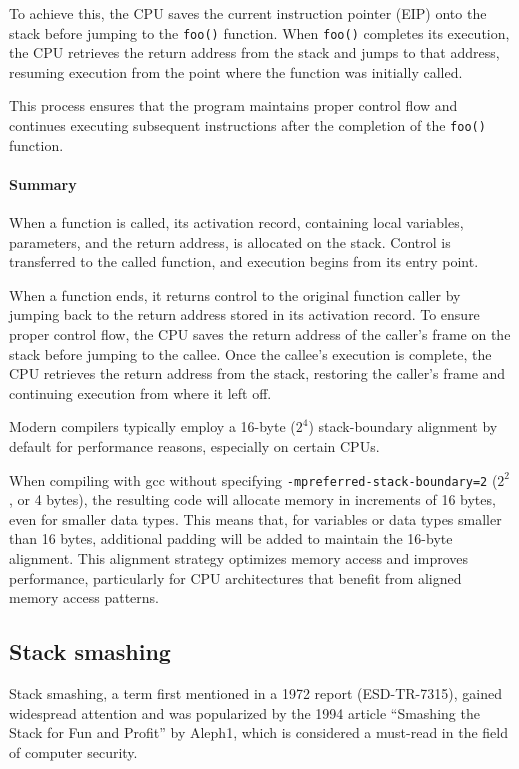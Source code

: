To achieve this, the CPU saves the current instruction pointer (EIP) onto the stack before jumping to the \texttt{foo()} function. 
When \texttt{foo()} completes its execution, the CPU retrieves the return address from the stack and jumps to that address, resuming execution from the point where the function was initially called.

This process ensures that the program maintains proper control flow and continues executing subsequent instructions after the completion of the \texttt{foo()} function.

\paragraph*{Summary}
When a function is called, its activation record, containing local variables, parameters, and the return address, is allocated on the stack. 
Control is transferred to the called function, and execution begins from its entry point.

When a function ends, it returns control to the original function caller by jumping back to the return address stored in its activation record. 
To ensure proper control flow, the CPU saves the return address of the caller's frame on the stack before jumping to the callee. 
Once the callee's execution is complete, the CPU retrieves the return address from the stack, restoring the caller's frame and continuing execution from where it left off.

Modern compilers typically employ a 16-byte ($2^4$) stack-boundary alignment by default for performance reasons, especially on certain CPUs.

When compiling with gcc without specifying \texttt{-mpreferred-stack-boundary=2} ($2^2$, or 4 bytes), the resulting code will allocate memory in increments of 16 bytes, even for smaller data types.
This means that, for variables or data types smaller than 16 bytes, additional padding will be added to maintain the 16-byte alignment.
This alignment strategy optimizes memory access and improves performance, particularly for CPU architectures that benefit from aligned memory access patterns.

\subsection{Stack smashing}
Stack smashing, a term first mentioned in a 1972 report (ESD-TR-7315), gained widespread attention and was popularized by the 1994 article ``Smashing the Stack for Fun and Profit'' by Aleph1, which is considered a must-read in the field of computer security.

